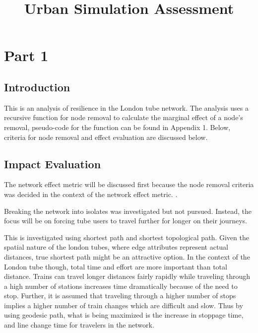 \documentclass[11pt]{article} %
\title{\vspace{-3.0cm}Urban Simulation Assessment}
\begin{document}
\maketitle


\section{Part 1}



\subsection{Introduction}

This is an analysis of resilience in the London tube network. The analysis uses a recursive function for node removal to calculate the marginal effect of a node's removal, pseudo-code for the function can be found in Appendix 1. Below, criteria for node removal and effect evaluation are discussed below. 


\subsection{Impact Evaluation}
The network effect metric will be discussed first because the node removal criteria was decided in the context of the network effect metric. . 

Breaking the network into isolates was investigated but not pursued. Instead, the focus will be on forcing tube users to travel further for longer on their journeys. 

This is investigated using shortest path and shortest topological path. Given the spatial nature of the london tubes, where edge attributes represent actual distances, true shortest path might be an attractive option. In the context of the London tube though, total time and effort are more important than total distance. Trains can travel longer distances fairly rapidly while traveling through a high number of stations increases time dramatically because of the need to stop. Further, it is assumed that traveling through a higher number of stops implies a higher number of train changes which are difficult and slow. Thus by using geodesic path, what is being maximized is the increase in stoppage time, and line change time for travelers in the network.
\end{document}
